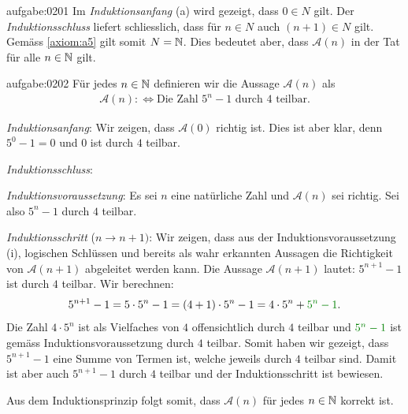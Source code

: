 \begin{antwort}{aufgabe:0201}
Im \textit{Induktionsanfang} (a) wird gezeigt, dass $0\in N$ gilt. Der \textit{Induktionsschluss} liefert schliesslich, dass für $n\in N$ auch $(n+1)\in N$ gilt. Gemäss \cref{axiom:a5} gilt somit $N=\mathbb{N}$. Dies bedeutet aber, dass $\mathcal{A}(n)$ in der Tat für alle $n\in\mathbb{N}$ gilt.
\end{antwort}


\begin{antwort}{aufgabe:0202}
Für jedes $n\in\mathbb{N}$ definieren wir die Aussage $\mathcal{A}(n)$ als
\begin{align*}
    \mathcal{A}(n) :\iff \text{Die Zahl $5^n-1$ durch $4$ teilbar}.
\end{align*}
\begin{aenum}
    \item \textit{Induktionsanfang}: Wir zeigen, dass $\mathcal{A}(0)$ richtig ist. Dies ist aber klar, denn $5^0-1=0$ und $0$ ist durch $4$ teilbar.
    \item \textit{Induktionsschluss}:
        \begin{renum}
            \item \textit{Induktionsvoraussetzung}: Es sei $n$ eine natürliche Zahl und $\mathcal{A}(n)$ sei richtig. Sei also $5^n-1$ durch $4$ teilbar.
            \item \textit{Induktionsschritt} ($n\to n+1)$: Wir zeigen, dass aus der Induktionsvoraussetzung (i), logischen Schlüssen und bereits als wahr erkannten Aussagen die Richtigkeit von $\mathcal{A}(n+1)$ abgeleitet werden kann. Die Aussage $\mathcal{A}(n+1)$ lautet: $5^{n+1}-1$ ist durch $4$ teilbar. Wir berechnen:
            \begin{align*}
                5^{n+1}-1 = 5\cdot 5^{n}-1 = (4+1)\cdot 5^n - 1 = 4\cdot 5^n + \textcolor{Green}{5^n -1}.
            \end{align*}
            Die Zahl $4\cdot 5^n$ ist als Vielfaches von $4$ offensichtlich durch $4$ teilbar und $\textcolor{Green}{5^n -1}$ ist gemäss Induktionsvoraussetzung durch $4$ teilbar. Somit haben wir gezeigt, dass $5^{n+1}-1$ eine Summe von Termen ist, welche jeweils durch $4$ teilbar sind. Damit ist aber auch $5^{n+1}-1$ durch $4$ teilbar und der Induktionsschritt ist bewiesen.
        \end{renum}
\end{aenum}
Aus dem Induktionsprinzip folgt somit, dass $\mathcal{A}(n)$ für jedes $n\in\mathbb{N}$ korrekt ist.
\end{antwort}


